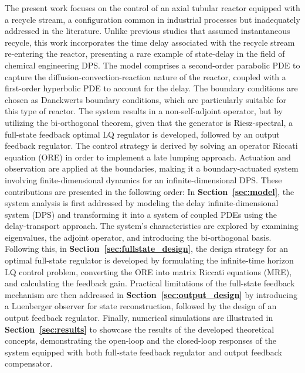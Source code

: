 The present work focuses on the control of an axial tubular reactor equipped with a recycle stream, a configuration common in industrial processes but inadequately addressed in the literature. Unlike previous studies that assumed instantaneous recycle, this work incorporates the time delay associated with the recycle stream re-entering the reactor, presenting a rare example of state-delay in the field of chemical engineering DPS. The model comprises a second-order parabolic PDE to capture the diffusion-convection-reaction nature of the reactor, coupled with a first-order hyperbolic PDE to account for the delay. The boundary conditions are chosen as Danckwerts boundary conditions, which are particularly suitable for this type of reactor. The system results in a non-self-adjoint operator, but by utilizing the bi-orthogonal theorem, given that the generator is Riesz-spectral, a full-state feedback optimal LQ regulator is developed, followed by an output feedback regulator. The control strategy is derived by solving an operator Riccati equation (ORE) in order to implement a late lumping approach. Actuation and observation are applied at the boundaries, making it a boundary-actuated system involving finite-dimensional dynamics for an infinite-dimensional DPS. These contributions are presented in the following order: In \textbf{Section~\ref{sec:model}}, the system analysis is first addressed by modeling the delay infinite-dimensional system (DPS) and transforming it into a system of coupled PDEs using the delay-transport approach. The system's characteristics are explored by examining eigenvalues, the adjoint operator, and introducing the bi-orthogonal basis. Following this, in \textbf{Section~\ref{sec:fullstate_design}}, the design strategy for an optimal full-state regulator is developed by formulating the infinite-time horizon LQ control problem, converting the ORE into matrix Riccati equations (MRE), and calculating the feedback gain. Practical limitations of the full-state feedback mechanism are then addressed in \textbf{Section~\ref{sec:output_design}} by introducing a Luenberger observer for state reconstruction, followed by the design of an output feedback regulator. Finally, numerical simulations are illustrated in \textbf{Section~\ref{sec:results}} to showcase the results of the developed theoretical concepts, demonstrating the open-loop and the closed-loop responses of the system equipped with both full-state feedback regulator and output feedback compensator.